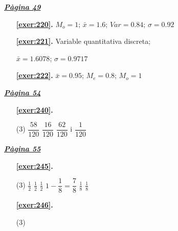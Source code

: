 
\hyperlink{page.49}{\textbf{\em Pàgina 49}}
\begin{enumerate}
\item[\fontfamily{phv}\selectfont\color{blue}\textbf{\ref{exer:220}. }] \label{ans:220} 
$M_o =1$; $\bar x=1.6$; $Var=0.84$; $\sigma =0.92$
 \end{enumerate}
\begin{enumerate}
\item[\fontfamily{phv}\selectfont\color{blue}\textbf{\ref{exer:221}. }] \label{ans:221} 
Variable quantitativa discreta;\par $\bar x=1.6078$; $\sigma =0.9717$
\item[\fontfamily{phv}\selectfont\color{blue}\textbf{\ref{exer:222}. }] \label{ans:222} 
$\bar x=0.95$; $M_e=0.8$; $M_o=1$
 \end{enumerate}
\vspace{0.3cm}


\hyperlink{page.54}{\textbf{\em Pàgina 54}}
\begin{enumerate}



 \item[\fontfamily{phv}\selectfont\color{blue}\textbf{\ref{exer:240}. }] \label{ans:240}
 \begin{tasks}[column-sep=1em, item-indent=1.3333em](3)
	 \task $\dfrac {58}{120}$
	 \task $\dfrac {16}{120}$
	 \task* $\dfrac {62}{120}$ i $\dfrac {1}{120}$ 
\end{tasks}
 \end{enumerate}
\vspace{0.3cm}


\hyperlink{page.55}{\textbf{\em Pàgina 55}}
\begin{enumerate}



 \item[\fontfamily{phv}\selectfont\color{blue}\textbf{\ref{exer:245}. }] \label{ans:245}
 \begin{tasks}[column-sep=1em, item-indent=1.3333em](3)
	 \task $\frac {1}{2}$
	 \task $\frac {1}{2}$
	 \task $\frac {1}{2}$
	 \task* $1-\dfrac {1}{8}=\dfrac {7}{8}$
	 \task $\frac {1}{8}$
	 \task $\frac {1}{8}$
\end{tasks}
 \end{enumerate}
\begin{enumerate}



 \item[\fontfamily{phv}\selectfont\color{blue}\textbf{\ref{exer:246}. }] \label{ans:246}
 \begin{tasks}[column-sep=1em, item-indent=1.3333em](3)
\end{tasks}
 \end{enumerate}
\vspace{0.3cm}


